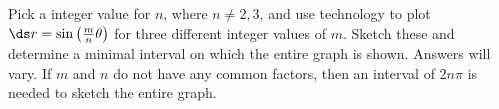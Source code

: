 {Pick a integer value for $n$, where $n\neq 2,3$, and use technology to plot $\ds r=\sin\left(\frac mn\theta\right)$ for three different integer values of $m$. Sketch these and determine a minimal interval on which the entire graph is shown.}
{Answers will vary. If $m$ and $n$ do not have any common factors, then an interval of $2n\pi$ is needed to sketch the entire graph.
}
